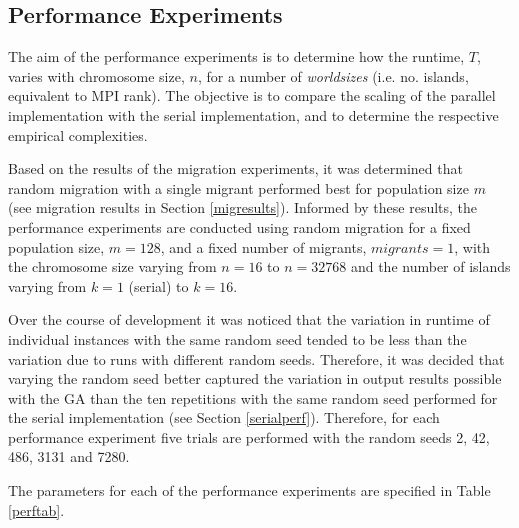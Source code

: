 \documentclass{report}
\begin{document}
\subsection{Performance Experiments}
\label{perfexp}
The aim of the performance experiments is to determine how the runtime, \(T\), varies with chromosome size, \(n\), for a number of \emph{worldsizes} (i.e. no. islands, equivalent to MPI rank). The objective is to compare the scaling of the parallel implementation with the serial implementation, and to determine the respective empirical complexities.

Based on the results of the migration experiments, it was determined that random migration with a single migrant performed best for population size \(m\) (see migration  results in Section \ref{migresults}). Informed by these results, the performance experiments are conducted using random migration for a fixed population size, \(m=128\), and a fixed number of migrants, \(migrants=1\), with the chromosome size varying from \(n=16\) to \(n=32768\) and the number of islands varying from \(k=1\) (serial) to \(k=16\).

Over the course of development it was noticed that the variation in runtime of individual instances with the same random seed tended to be less than the variation due to runs with different random seeds. Therefore, it was decided that varying the random seed better captured the variation in output results possible with the GA than the ten repetitions with the same random seed performed for the serial implementation (see Section \ref{serialperf}). Therefore, for each performance experiment five trials are performed with the random seeds 2, 42, 486, 3131 and 7280.

The parameters for each of the performance experiments are specified in Table \ref{perftab}.
\end{document}
